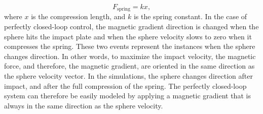 \documentclass[letterpaper, 10 pt, conference]{ieeeconf}  %
\begin{document}
\begin{equation}
F_{\text{spring}}=k x,
\label{spring_force}
\end{equation}
where $x$ is the compression length, and $k$ is the spring constant. In the case of perfectly closed-loop control, the magnetic gradient direction is changed when the sphere hits the impact plate and when the sphere velocity slows to zero when it compresses the spring. These two events represent the instances when the sphere changes direction. In other words, to maximize the impact velocity, the magnetic force, and therefore, the magnetic gradient, are oriented in the same direction as the sphere velocity vector. In the simulations, the sphere changes direction after impact, and after the full compression of the spring. The perfectly closed-loop system can therefore be easily modeled by applying a magnetic gradient that is always in the same direction as the sphere velocity.
\end{document}
